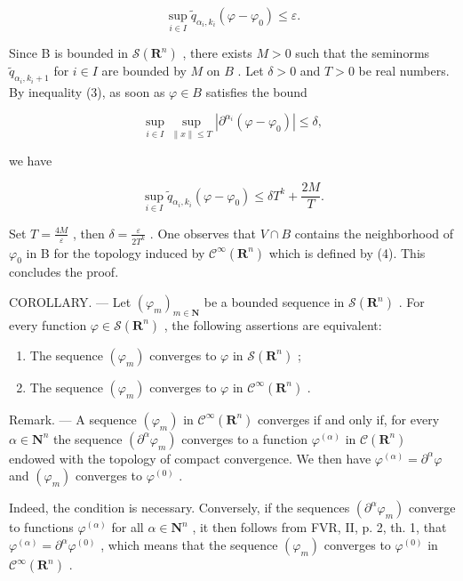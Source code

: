 \[
\sup _ {i \in I} \widetilde {q} _ {\alpha_ {i}, k _ {i}} (\varphi - \varphi_ {0}) \leqslant \varepsilon .
\]

Since B is bounded in \(\mathcal{S}(\mathbf{R}^{n})\) , there exists \(M > 0\) such that the seminorms \(\widetilde{q}_{\alpha_{i},k_{i} + 1}\) for \(i\in I\) are bounded by \(M\) on \(B\) . Let \(\delta >0\) and \(T > 0\) be real numbers. By inequality (3), as soon as \(\varphi \in B\) satisfies the bound

\[
\sup _ {i \in I} \sup _ {\| x \| \leqslant T} | \partial^ {\alpha_ {i}} (\varphi - \varphi_ {0}) | \leqslant \delta ,\tag{4}
\]

we have

\[
\sup _ {i \in I} \widetilde {q} _ {\alpha_ {i}, k _ {i}} (\varphi - \varphi_ {0}) \leqslant \delta T ^ {k} + \frac {2 M}{T}.
\]

Set \(T = \frac{4M}{\varepsilon}\) , then \(\delta = \frac{\varepsilon}{2T^{k}}\) . One observes that \(V \cap B\) contains the neighborhood of \(\varphi_{0}\) in B for the topology induced by \(\mathcal{C}^{\infty}(\mathbf{R}^{n})\) which is defined by (4). This concludes the proof.

COROLLARY. --- Let \((\varphi_{m})_{m\in\mathbf{N}}\) be a bounded sequence in \(\mathcal{S}(\mathbf{R}^{n})\) . For every function \(\varphi\in\mathcal{S}(\mathbf{R}^{n})\) , the following assertions are equivalent:

\begin{enumerate}
\def\labelenumi{\alph{enumi})}
\item
  The sequence \((\varphi_{m})\) converges to \(\varphi\) in \(\mathcal{S}(\mathbf{R}^n)\) ;
\item
  The sequence \((\varphi_{m})\) converges to \(\varphi\) in \(\mathcal{C}^{\infty}(\mathbf{R}^{n})\) .
\end{enumerate}

Remark. --- A sequence \((\varphi_{m})\) in \(\mathcal{C}^{\infty}(\mathbf{R}^{n})\) converges if and only if, for every \(\alpha\in \mathbf{N}^{n}\) the sequence \((\partial^{\alpha}\varphi_{m})\) converges to a function \(\varphi^{(\alpha)}\) in \(\mathcal{C}(\mathbf{R}^{n})\) endowed with the topology of compact convergence. We then have \(\varphi^{(\alpha)}=\partial^{\alpha}\varphi\) and \((\varphi_{m})\) converges to \(\varphi^{(0)}\) .

Indeed, the condition is necessary. Conversely, if the sequences \((\partial^{\alpha}\varphi_{m})\) converge to functions \(\varphi^{(\alpha)}\) for all \(\alpha\in \mathbf{N}^{n}\) , it then follows from FVR, II, p. 2, th. 1, that \(\varphi^{(\alpha)}=\partial^{\alpha}\varphi^{(0)}\) , which means that the sequence \((\varphi_{m})\) converges to \(\varphi^{(0)}\) in \(\mathcal{C}^{\infty}(\mathbf{R}^{n})\) .


